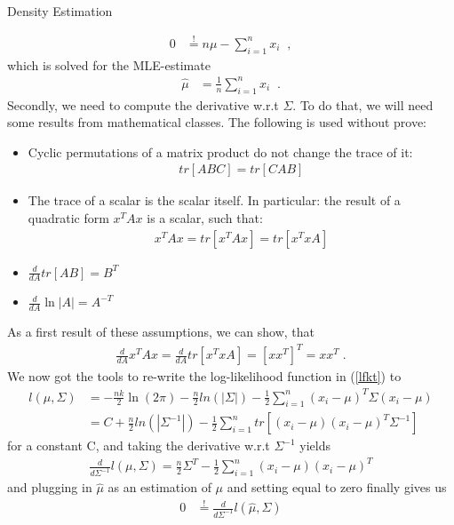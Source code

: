 \documentclass[
ngerman,
]{tudaexercise}
\newcommand{\sni}{\sum_{i=1}^{n}}
\begin{document}
\begin{task}{Density Estimation}
\begin{subtask}
			\begin{align*}
				0&\stackrel{!}{=}n\mu-\sni x_i\;\;,
			\end{align*}
			which is solved for the MLE-estimate
			\begin{align}\label{mean}
				\hat{\mu}&=\frac{1}{n}\sni x_i\;\;.
			\end{align}
			Secondly, we need to compute the derivative w.r.t $\Sigma$. To do that, we will need some results from mathematical classes. The following is used without prove:
			\begin{itemize}
				\item Cyclic permutations of a matrix product do not change the trace of it:\begin{align*}
					tr\left[ ABC\right] = tr\left[ CAB\right] 
				\end{align*}
				\item The trace of a scalar is the scalar itself. In particular: the result of a quadratic form $x^T Ax$ is a scalar, such that:\begin{align*}
					x^T Ax=tr\left[ x^TAx\right] =tr\left[ x^TxA\right] 
				\end{align*}
				\item $\frac{d}{dA}tr\left[ AB\right] =B^T$
				\item $\frac{d}{dA}\ln|A|=A^{-T}$
			\end{itemize}
		As a first result of these assumptions, we can show, that\begin{align*}
			\frac{d}{dA}x^T Ax=\frac{d}{dA}tr\left[ x^T xA\right] =\left[ xx^T\right] ^T=xx^T\;.
		\end{align*} 
		We now got the tools to re-write the log-likelihood function in (\ref{lfkt}) to
		\begin{align*}
			l(\mu,\Sigma)&=-\frac{nk}{2}\ln(2\pi)-\frac{n}{2}ln(|\Sigma|)-\frac{1}{2}\sni (x_i-\mu)^T\Sigma(x_i-\mu)\\&=C+\frac{n}{2}ln(|\Sigma^{-1}|)-\frac{1}{2}\sni tr\left[ (x_i-\mu)(x_i-\mu)^T \Sigma^{-1}\right] 
		\end{align*}
		for a constant C, and taking the derivative w.r.t $\Sigma^{-1}$ yields
		\begin{align*}
			\frac{d}{d\Sigma^{-1}}l(\mu,\Sigma)=\frac{n}{2}\Sigma^T-\frac{1}{2}\sni(x_i-\mu)(x_i-\mu)^T
		\end{align*}
		and plugging in $\hat{\mu}$ as an estimation of $\mu$ and setting equal to zero finally gives us
		\begin{align*}
			0&\stackrel{!}{=}\frac{d}{d\Sigma^{-1}}l(\hat{\mu},\Sigma)\\

\end{align*}
\end{subtask}
\end{task}
\end{document}
